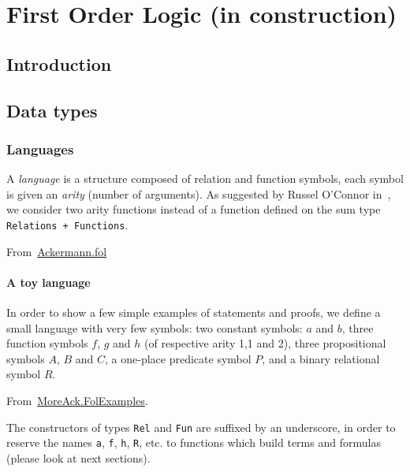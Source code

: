 \chapter{First Order Logic (in construction)}
\label{chap:fol}

\section{Introduction}

\section{Data types}

\subsection{Languages}

A \emph{language} is a structure composed of relation and function symbols, each symbol is given an \emph{arity} (number of arguments). As suggested by Russel O'Connor in~\cite{OConnor05}, we consider two arity functions instead of a function defined on the sum type \texttt{Relations + Functions}.

From~\href{../theories/html/hydras.Ackermann.fol.html}{Ackermann.fol}


\subsubsection{A toy language}
In order to show a few simple examples of statements and proofs, we define a small language with very few symbols:
two constant symbols: $a$ and $b$, three function symbols $f$, $g$ and $h$  (of respective arity 1,1 and 2), three propositional symbols $A$, $B$ and $C$, a one-place predicate symbol $P$, and a binary relational symbol $R$. 
 
From~\href{../theories/html/hydras.MoreAck.FolExamples.html}{MoreAck.FolExamples}.


\begin{remark}
  The constructors of types \texttt{Rel} and \texttt{Fun} are suffixed by an underscore, in order to reserve the names \texttt{a}, \texttt{f}, \texttt{h}, \texttt{R}, etc. to functions which build terms and formulas
(please look at next sections).

\end{remark}


